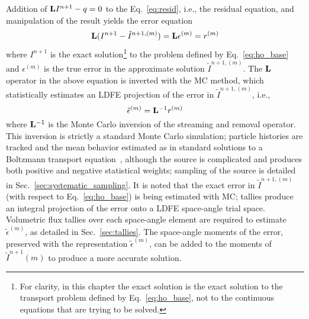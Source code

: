 Addition of $\mathbf{L} I^{n+1} - q=0$ to the Eq.~\eqref{eq:resid}, i.e., the residual equation,
and manipulation of the result yields the error equation
\begin{equation}\label{eq:err_eq}
    \mathbf{L} (I^{n+1} - \tilde{I}^{n+1,(m)}) = \mathbf{L} {\epsilon}^{(m)} = r^{(m)}
\end{equation}
where $I^{n+1}$ is the exact solution\footnote{For clarity, in this chapter the exact solution is the
    exact solution to the transport problem defined by Eq.~\eqref{eq:ho_base}, not to the
continuous equations that are trying to be solved.}  to the problem defined by Eq.~\eqref{eq:ho_base} and
${\epsilon}^{(m)}$ is the true error in the approximate solution $\tilde{I}^{n+1,(m)}$. 
The $\mathbf{L}$ operator in the above equation is inverted with the MC method, which
statistically estimates an LDFE projection of the error in $\tilde{I}^{n+1,(m)}$, i.e., 
\begin{equation}\label{eq:mc_err}
\tilde{\epsilon}^{(m)} = \mathbf{L}^{-1} r^{(m)}
\end{equation}
where $\mathbf{L}^{-1}$ is the Monte Carlo inversion of the streaming and removal operator.  
This inversion is strictly a standard Monte Carlo simulation; particle histories are
tracked and the mean behavior estimated as in standard solutions to a Boltzmann transport
equation~\cite{shultic_mc,mcnp}, although the source is
complicated and produces both positive and negative statistical weights; sampling of the
source is detailed in Sec.~\ref{sec:systematic_sampling}.  
It is noted that the exact error in $\tilde{I}^{n+1,(m)}$ (with respect to
Eq.~\eqref{eq:ho_base}) is being estimated with MC;
tallies produce an integral projection of the error onto a LDFE space-angle trial space. 
Volumetric flux tallies over each space-angle element are required to estimate
$\tilde{\epsilon}^{(m)}$, as detailed in Sec.~\ref{sec:tallies}.  
The
space-angle moments of the error, preserved with the representation $\tilde{\epsilon}^{(m)}$, can be added to the
moments of $\tilde{I}^{n+1}(m)$ to produce a more accurate solution.  

